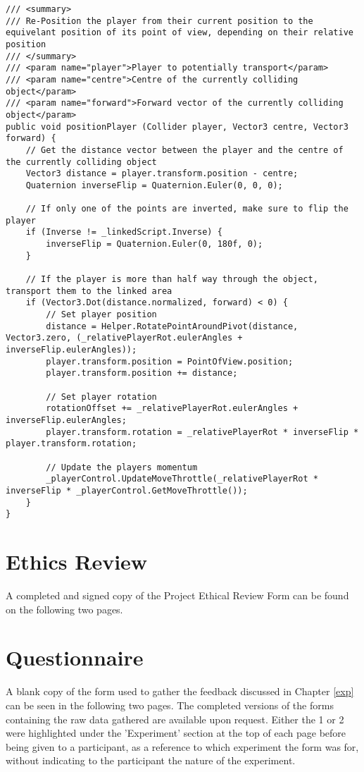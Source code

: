 		\begin{lstlisting}[caption="Player Positioning - CameraRenderPosition.cs", label=appendix:code:player, firstnumber=125]
/// <summary>
/// Re-Position the player from their current position to the equivelant position of its point of view, depending on their relative position
/// </summary>
/// <param name="player">Player to potentially transport</param>
/// <param name="centre">Centre of the currently colliding object</param>
/// <param name="forward">Forward vector of the currently colliding object</param>
public void positionPlayer (Collider player, Vector3 centre, Vector3 forward) {
	// Get the distance vector between the player and the centre of the currently colliding object
	Vector3 distance = player.transform.position - centre;
	Quaternion inverseFlip = Quaternion.Euler(0, 0, 0);

	// If only one of the points are inverted, make sure to flip the player
	if (Inverse != _linkedScript.Inverse) {
		inverseFlip = Quaternion.Euler(0, 180f, 0);
	}

	// If the player is more than half way through the object, transport them to the linked area
	if (Vector3.Dot(distance.normalized, forward) < 0) {
		// Set player position
		distance = Helper.RotatePointAroundPivot(distance, Vector3.zero, (_relativePlayerRot.eulerAngles + inverseFlip.eulerAngles));
		player.transform.position = PointOfView.position;
		player.transform.position += distance;

		// Set player rotation
		rotationOffset += _relativePlayerRot.eulerAngles + inverseFlip.eulerAngles;
		player.transform.rotation = _relativePlayerRot * inverseFlip * player.transform.rotation;

		// Update the players momentum
		_playerControl.UpdateMoveThrottle(_relativePlayerRot * inverseFlip * _playerControl.GetMoveThrottle());
	}
}
		\end{lstlisting}

	\section{Ethics Review}
	\label{appendix:ethics}
		A completed and signed copy of the Project Ethical Review Form can be found on the following two pages.

		

	\section{Questionnaire}
	\label{appendix:question}
		A blank copy of the form used to gather the feedback discussed in Chapter \ref{exp} can be seen in the following two pages. The completed versions of the forms containing the raw data gathered are available upon request. Either the 1 or 2 were highlighted under the 'Experiment' section at the top of each page before being given to a participant, as a reference to which experiment the form was for, without indicating to the participant the nature of the experiment.

		
